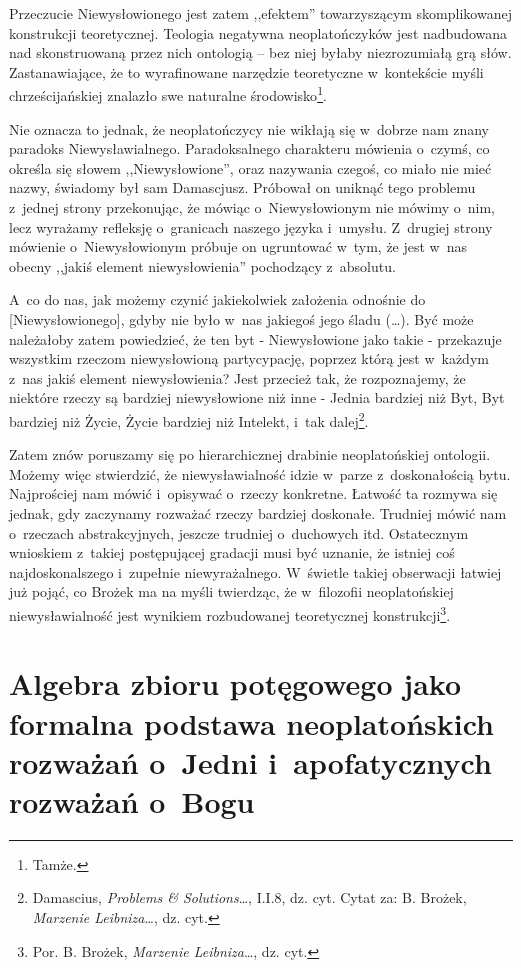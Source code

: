 Przeczucie Niewysłowionego jest zatem ,,efektem'' towarzyszącym skomplikowanej konstrukcji teoretycznej. Teologia negatywna neoplatończyków jest nadbudowana nad skonstruowaną przez nich ontologią -- bez niej byłaby niezrozumiałą grą słów. Zastanawiające, że to wyrafinowane narzędzie teoretyczne w~kontekście myśli chrześcijańskiej znalazło swe naturalne środowisko\footnote{Tamże.}.

Nie oznacza to jednak, że neoplatończycy nie wikłają się w~dobrze nam znany paradoks Niewysławialnego. Paradoksalnego charakteru mówienia o~czymś, co określa się słowem ,,Niewysłowione'', oraz nazywania czegoś, co miało nie mieć nazwy, świadomy był sam Damascjusz. Próbował on uniknąć tego problemu z~jednej strony przekonując, że mówiąc o~Niewysłowionym nie mówimy o~nim, lecz wyrażamy refleksję o~granicach naszego języka i~umysłu. Z~drugiej strony mówienie o~Niewysłowionym próbuje on ugruntować w~tym, że jest w~nas obecny ,,jakiś element niewysłowienia'' pochodzący z~absolutu.

A~co do nas, jak możemy czynić jakiekolwiek założenia odnośnie do [Niewysłowionego], gdyby nie było w~nas jakiegoś jego śladu (…). Być może należałoby zatem powiedzieć, że ten byt - Niewysłowione jako takie - przekazuje wszystkim rzeczom niewysłowioną partycypację, poprzez którą jest w~każdym z~nas jakiś element niewysłowienia? Jest przecież tak, że rozpoznajemy, że niektóre rzeczy są bardziej niewysłowione niż inne - Jednia bardziej niż Byt, Byt bardziej niż Życie, Życie bardziej niż Intelekt, i~tak dalej\footnote{Damascius, \textit{Problems \& Solutions}…, I.I.8, dz. cyt. Cytat za: B. Brożek, \textit{Marzenie Leibniza}…, dz. cyt.}.

Zatem znów poruszamy się po hierarchicznej drabinie neoplatońskiej ontologii. Możemy więc stwierdzić, że niewysławialność idzie w~parze z~doskonałością bytu. Najprościej nam mówić i~opisywać o~rzeczy konkretne. Łatwość ta rozmywa się jednak, gdy zaczynamy rozważać rzeczy bardziej doskonałe. Trudniej mówić nam o~rzeczach abstrakcyjnych, jeszcze trudniej o~duchowych itd. Ostatecznym wnioskiem z~takiej postępującej gradacji musi być uznanie, że istniej coś najdoskonalszego i~zupełnie niewyrażalnego. W~świetle takiej obserwacji łatwiej już pojąć, co Brożek ma na myśli twierdząc, że w~filozofii neoplatońskiej niewysławialność jest wynikiem rozbudowanej teoretycznej konstrukcji\footnote{Por. B. Brożek, \textit{Marzenie Leibniza}…, dz. cyt.}.

\section{Algebra zbioru potęgowego jako formalna podstawa neoplatońskich rozważań o~Jedni i~apofatycznych rozważań o~Bogu}

